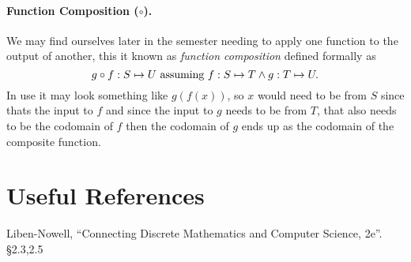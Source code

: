 \paragraph{Function Composition ($\circ$).}
We may find ourselves later in the semester needing to apply one function to the output of another,
this it known as \emph{function composition} defined formally as
\[
g\circ f: S \mapsto U \textnormal{ assuming } f: S \mapsto T \wedge g : T \mapsto U.
\]
In use it may look something like $g\left(f\left(x\right)\right)$, 
so $x$ would need to be from $S$ since thats the input to $f$ and since the input to $g$ needs to be from $T$, 
that also needs to be the codomain of $f$ then the codomain of $g$ ends up as the codomain of the composite function. 

\section*{Useful References}
Liben-Nowell, ``Connecting Discrete Mathematics and Computer Science, 2e''. \S 2.3,2.5

  